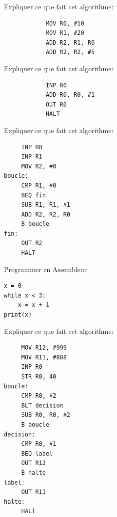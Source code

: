 \newpage


\begin{minipage}[t]{0.48\linewidth}
	\begin{exercice_cours}{Expliquer ce que fait cet algorithme:}{}
		
		\begin{verbatim}
			MOV R0, #10
			MOV R1, #20
			ADD R2, R1, R0
			ADD R2, R2, #5
		\end{verbatim}
	\end{exercice_cours}
\end{minipage}\hfill
\begin{minipage}[t]{0.48\linewidth}
	\begin{exercice_cours}{Expliquer ce que fait cet algorithme:}{}
		
		\begin{verbatim}
			INP R0
			ADD R0, R0, #1
			OUT R0
			HALT
		\end{verbatim}
	\end{exercice_cours}
\end{minipage}



\begin{minipage}[t]{0.48\linewidth}
	\begin{exercice_cours}{Expliquer ce que fait cet algorithme:}{}
		
		\begin{verbatim}
     INP R0
     INP R1
     MOV R2, #0
boucle:
     CMP R1, #0
     BEQ fin
     SUB R1, R1, #1
     ADD R2, R2, R0
     B boucle
fin:
     OUT R2
     HALT
\end{verbatim}
	\end{exercice_cours}

	\begin{exercice_cours}{Programmer en Assembleur}
		\begin{lstlisting}
x = 0
while x < 3:
	x = x + 1
print(x)
		\end{lstlisting}
	\end{exercice_cours}
\end{minipage}\hfill
\begin{minipage}[t]{0.48\linewidth}
	\begin{exercice_cours}{Expliquer ce que fait cet algorithme:}{}
		
		\begin{verbatim}
     MOV R12, #999
     MOV R11, #888
     INP R0 
     STR R0, 40 
boucle:
     CMP R0, #2 
     BLT decision
     SUB R0, R0, #2
     B boucle
decision:
     CMP R0, #1
     BEQ label
     OUT R12
     B halte
label:
     OUT R11
halte:
     HALT
	  
		\end{verbatim}
	\end{exercice_cours}
\end{minipage}

